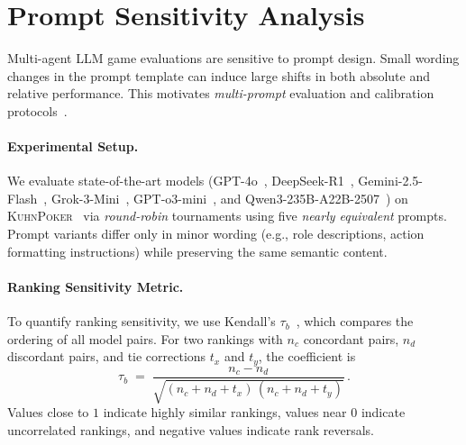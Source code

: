 \appendix


\section{Prompt Sensitivity Analysis}
\label{appendix:prompt_sensitivity}

Multi-agent LLM game evaluations are sensitive to prompt design. Small wording changes in the prompt template can induce large shifts in both absolute and relative performance. This motivates \emph{multi-prompt} evaluation and calibration protocols~\citep{mizrahi2024state,zhao2021calibrate}.

\paragraph{Experimental Setup.}
We evaluate state-of-the-art models (GPT-4o~\citep{openai2024gpt4ocard}, DeepSeek-R1~\citep{guo2025deepseek}, Gemini-2.5-Flash~\citep{comanici2025gemini}, Grok-3-Mini~\citep{xai2025grok3beta}, GPT-o3-mini~\citep{openai_o3_mini}, and Qwen3-235B-A22B-2507~\citep{qwen2025qwen25technicalreport}) on \textsc{KuhnPoker}~\citep{Kuhn1951} via \emph{round-robin} tournaments using five \emph{nearly equivalent} prompts. Prompt variants differ only in minor wording (e.g., role descriptions, action formatting instructions) while preserving the same semantic content.

\paragraph{Ranking Sensitivity Metric.}
To quantify ranking sensitivity, we use Kendall's $\tau_b$~\citep{kendall1938new}, which compares the ordering of all model pairs. For two rankings with $n_c$ concordant pairs, $n_d$ discordant pairs, and tie corrections $t_x$ and $t_y$, the coefficient is
\[
\tau_b \;=\; \frac{n_c - n_d}{\sqrt{(n_c + n_d + t_x)\,(n_c + n_d + t_y)}}\,.
\]
Values close to $1$ indicate highly similar rankings, values near $0$ indicate uncorrelated rankings, and negative values indicate rank reversals.

